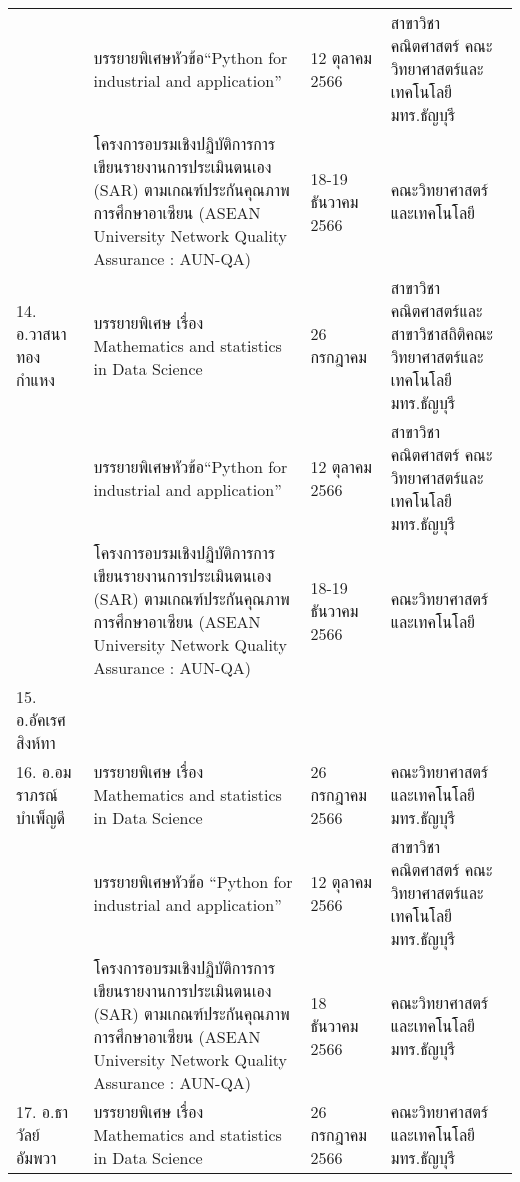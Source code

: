 \begin{longtable}{|p{}|>{\raggedright}p{}|>{\raggedright}p{}|p{}|}
\cline{2-4} 
&บรรยายพิเศษหัวข้อ\newline “Python for industrial and application”	
&12 ตุลาคม 2566	
&สาขาวิชาคณิตศาสตร์ คณะวิทยาศาสตร์และเทคโนโลยี มทร.ธัญบุรี\\ 
\cline{2-4}
&โครงการอบรมเชิงปฏิบัติการ\newline การเขียนรายงานการประเมินตนเอง (SAR) ตามเกณฑ์ประกันคุณภาพการศึกษาอาเซียน (ASEAN University Network Quality Assurance : AUN-QA)
&18-19 ธันวาคม 2566	
&คณะวิทยาศาสตร์และเทคโนโลยี\\ 
\hline
14. อ.วาสนา ทองกำแหง	&บรรยายพิเศษ เรื่อง Mathematics and statistics in Data Science
& 26 กรกฎาคม\newline 2566                  
&สาขาวิชาคณิตศาสตร์และสาขาวิชาสถิติ\newline คณะวิทยาศาสตร์และเทคโนโลยี มทร.ธัญบุรี\\
\cline{2-4} 
&บรรยายพิเศษหัวข้อ\newline “Python for industrial and application”	
&12 ตุลาคม 2566	
&สาขาวิชาคณิตศาสตร์ คณะวิทยาศาสตร์และเทคโนโลยี มทร.ธัญบุรี\\ 
\cline{2-4}
&โครงการอบรมเชิงปฏิบัติการ\newline การเขียนรายงานการประเมินตนเอง (SAR) ตามเกณฑ์ประกันคุณภาพการศึกษาอาเซียน (ASEAN University Network Quality Assurance : AUN-QA)
&18-19 ธันวาคม 2566	
&คณะวิทยาศาสตร์และเทคโนโลยี\\ 
\hline
15. อ.อัคเรศ สิงห์ทา&\multicolumn{3}{c|}{ลาศึกษาต่อ}\\
\hline
16. อ.อมราภรณ์ บำเพ็ญดี
&บรรยายพิเศษ เรื่อง Mathematics and statistics in Data Science	
&26 กรกฎาคม 2566	
&คณะวิทยาศาสตร์และเทคโนโลยี มทร.ธัญบุรี\\             
\cline{2-4}
&บรรยายพิเศษหัวข้อ “Python for industrial and application”	
&12 ตุลาคม 2566	
&สาขาวิชาคณิตศาสตร์ คณะวิทยาศาสตร์และเทคโนโลยี มทร.ธัญบุรี\\             
\hline
&โครงการอบรมเชิงปฏิบัติการ\newline การเขียนรายงานการประเมินตนเอง (SAR) ตามเกณฑ์ประกันคุณภาพการศึกษาอาเซียน (ASEAN University Network Quality Assurance : AUN-QA)
&18 ธันวาคม 2566	
&คณะวิทยาศาสตร์และเทคโนโลยี มทร.ธัญบุรี\\ 
\hline
17. อ.ธาวัลย์ อัมพวา
&บรรยายพิเศษ เรื่อง Mathematics and statistics in Data Science	
&26 กรกฎาคม 2566	
&คณะวิทยาศาสตร์และเทคโนโลยี มทร.ธัญบุรี\\             

\end{longtable}
